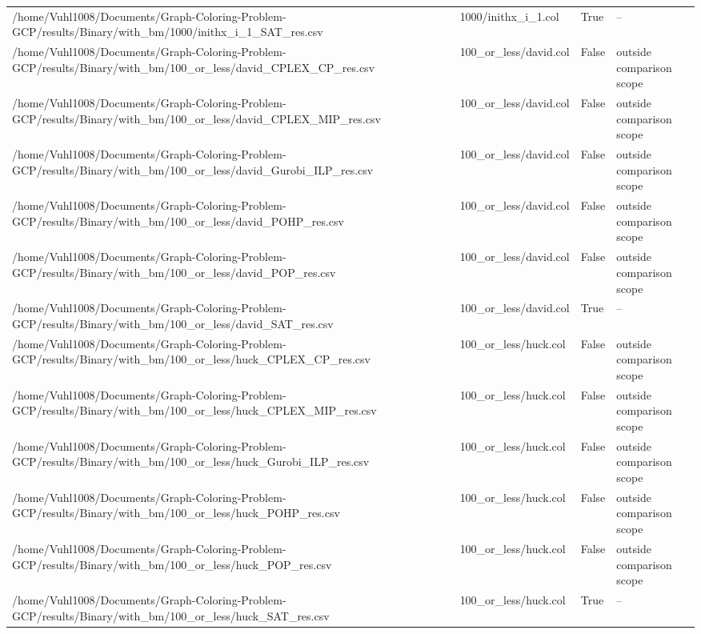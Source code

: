 \begin{table}[htbp]
\begin{tabular}{llll}
/home/Vuhl1008/Documents/Graph-Coloring-Problem-GCP/results/Binary/with\_bm/1000/inithx\_i\_1\_SAT\_res.csv & 1000/inithx\_i\_1.col & True & -- \\
/home/Vuhl1008/Documents/Graph-Coloring-Problem-GCP/results/Binary/with\_bm/100\_or\_less/david\_CPLEX\_CP\_res.csv & 100\_or\_less/david.col & False & outside comparison scope \\
/home/Vuhl1008/Documents/Graph-Coloring-Problem-GCP/results/Binary/with\_bm/100\_or\_less/david\_CPLEX\_MIP\_res.csv & 100\_or\_less/david.col & False & outside comparison scope \\
/home/Vuhl1008/Documents/Graph-Coloring-Problem-GCP/results/Binary/with\_bm/100\_or\_less/david\_Gurobi\_ILP\_res.csv & 100\_or\_less/david.col & False & outside comparison scope \\
/home/Vuhl1008/Documents/Graph-Coloring-Problem-GCP/results/Binary/with\_bm/100\_or\_less/david\_POHP\_res.csv & 100\_or\_less/david.col & False & outside comparison scope \\
/home/Vuhl1008/Documents/Graph-Coloring-Problem-GCP/results/Binary/with\_bm/100\_or\_less/david\_POP\_res.csv & 100\_or\_less/david.col & False & outside comparison scope \\
/home/Vuhl1008/Documents/Graph-Coloring-Problem-GCP/results/Binary/with\_bm/100\_or\_less/david\_SAT\_res.csv & 100\_or\_less/david.col & True & -- \\
/home/Vuhl1008/Documents/Graph-Coloring-Problem-GCP/results/Binary/with\_bm/100\_or\_less/huck\_CPLEX\_CP\_res.csv & 100\_or\_less/huck.col & False & outside comparison scope \\
/home/Vuhl1008/Documents/Graph-Coloring-Problem-GCP/results/Binary/with\_bm/100\_or\_less/huck\_CPLEX\_MIP\_res.csv & 100\_or\_less/huck.col & False & outside comparison scope \\
/home/Vuhl1008/Documents/Graph-Coloring-Problem-GCP/results/Binary/with\_bm/100\_or\_less/huck\_Gurobi\_ILP\_res.csv & 100\_or\_less/huck.col & False & outside comparison scope \\
/home/Vuhl1008/Documents/Graph-Coloring-Problem-GCP/results/Binary/with\_bm/100\_or\_less/huck\_POHP\_res.csv & 100\_or\_less/huck.col & False & outside comparison scope \\
/home/Vuhl1008/Documents/Graph-Coloring-Problem-GCP/results/Binary/with\_bm/100\_or\_less/huck\_POP\_res.csv & 100\_or\_less/huck.col & False & outside comparison scope \\
/home/Vuhl1008/Documents/Graph-Coloring-Problem-GCP/results/Binary/with\_bm/100\_or\_less/huck\_SAT\_res.csv & 100\_or\_less/huck.col & True & -- \\

\end{tabular}
\end{table}
